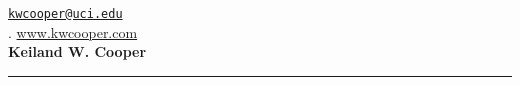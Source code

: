 \documentclass[10pt]{article}
\renewcommand\emph[1]{#1}
\newcommand{\makeheading}[2][]%
        {\hspace*{-\marginparsep minus \marginparwidth}%
         \begin{minipage}[t]{\textwidth+\marginparwidth+\marginparsep}%
             {\large \bfseries #2 \hfill #1}\\[-0.15\baselineskip]%
                 \rule{\columnwidth}{1pt}%
         \end{minipage}}
\renewcommand{\section}[1]{\pagebreak[3]%
    \vspace{1.3\baselineskip}%
    \phantomsection\addcontentsline{toc}{section}{#1}%
    \noindent\llap{\scshape\smash{\parbox[t]{\marginparwidth}{\hyphenpenalty=10000\raggedright #1}}}%
    \vspace{-\baselineskip}\par}
\providecommand*\emaillink[1]{\nolinkurl{#1}}
\providecommand*\email[1]{\href{mailto:#1}{\emaillink{#1}}}
\begin{document}
\thispagestyle{plain}

\hspace*{-\marginparsep minus \marginparwidth}%
 \begin{minipage}[t]{\textwidth+\marginparwidth+\marginparsep}%

\hfill \emph{\faEnvelope} \email{kwcooper@uci.edu}\\
. \hfill \emph{\faHome} \href{http://www.kwcooper.com/}{www.kwcooper.com}\\ 
\textbf{\huge{Keiland W. Cooper}} \hfill \\ 
[-0.15\baselineskip]%
\rule{\columnwidth}{1pt}%
\end{minipage}




%
%

%
%
%
%
\end{document}
